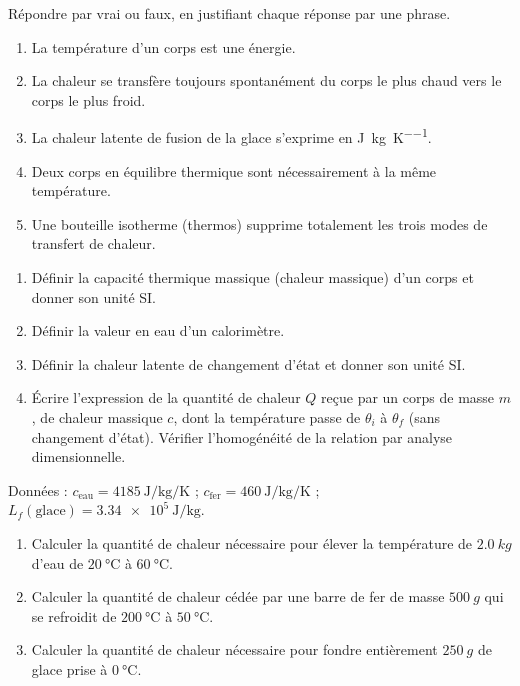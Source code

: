 \documentclass[11pt]{article}
\newcommand{\cle}[1]{{\popxbold\color{popdark}#1}}
\begin{document}
\begin{exercice}
Répondre par vrai ou faux, en justifiant chaque réponse par une phrase.
\begin{enumerate}
\item La température d'un corps est une énergie.
\item La chaleur se transfère toujours spontanément du corps le plus chaud vers le corps le plus froid.
\item La chaleur latente de fusion de la glace s'exprime en \si{\joule\per\kilogram\per\kelvin}.
\item Deux corps en équilibre thermique sont nécessairement à la même température.
\item Une bouteille isotherme (thermos) supprime totalement les trois modes de transfert de chaleur.
\end{enumerate}
\end{exercice}

\begin{exercice}
\begin{enumerate}
\item Définir la \cle{capacité thermique massique} (chaleur massique) d'un corps et donner son unité SI.
\item Définir la \cle{valeur en eau} d'un calorimètre.
\item Définir la \cle{chaleur latente} de changement d'état et donner son unité SI.
\item Écrire l'expression de la quantité de chaleur $Q$ reçue par un corps de masse $m$, de chaleur massique $c$, dont la température passe de $\theta_i$ à $\theta_f$ (sans changement d'état). Vérifier l'homogénéité de la relation par analyse dimensionnelle.
\end{enumerate}
\end{exercice}

\begin{exercice}
Données : $c_{\text{eau}} = \SI{4185}{\joule\per\kilogram\per\kelvin}$ ; $c_{\text{fer}} = \SI{460}{\joule\per\kilogram\per\kelvin}$ ; $L_f(\text{glace}) = \SI{3,34e5}{\joule\per\kilogram}$.
\begin{enumerate}
\item Calculer la quantité de chaleur nécessaire pour élever la température de $\SI{2,0}{kg}$ d'eau de $\SI{20}{\celsius}$ à $\SI{60}{\celsius}$.
\item Calculer la quantité de chaleur cédée par une barre de fer de masse $\SI{500}{g}$ qui se refroidit de $\SI{200}{\celsius}$ à $\SI{50}{\celsius}$.
\item Calculer la quantité de chaleur nécessaire pour fondre entièrement $\SI{250}{g}$ de glace prise à $\SI{0}{\celsius}$.
\end{enumerate}
\end{exercice}
\end{document}
